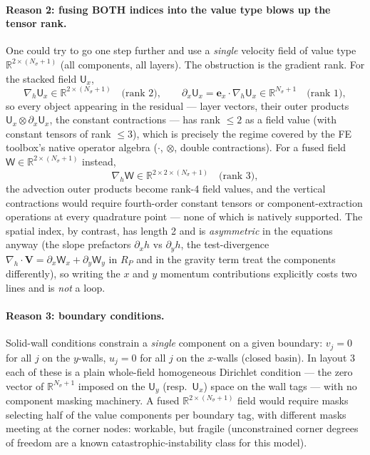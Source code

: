 \documentclass{article}
\newcommand{\Ns}{N_\sigma}
\newcommand{\nablah}{\nabla_h}
\begin{document}
\paragraph{Reason 2: fusing BOTH indices into the value type blows up the tensor rank.}
One could try to go one step further and use a \emph{single} velocity field of value type $\mathbb{R}^{2\times(\Ns+1)}$ (all components, all layers). The obstruction is the gradient rank. For the stacked field $\mathsf{U}_x$,
$$\nablah \mathsf{U}_x \in \mathbb{R}^{2\times(\Ns+1)} \quad\text{(rank 2)}, \qquad \partial_x \mathsf{U}_x = \mathbf{e}_x \cdot \nablah\mathsf{U}_x \in \mathbb{R}^{\Ns+1} \quad\text{(rank 1)},$$
so every object appearing in the residual — layer vectors, their outer products $\mathsf{U}_x \otimes \partial_x \mathsf{U}_x$, the constant contractions — has rank $\le 2$ as a field value (with constant tensors of rank $\le 3$), which is precisely the regime covered by the FE toolbox's native operator algebra ($\cdot$, $\otimes$, double contractions). For a fused field $\mathsf{W} \in \mathbb{R}^{2\times(\Ns+1)}$ instead,
$$\nablah \mathsf{W} \in \mathbb{R}^{2\times 2\times(\Ns+1)} \quad\text{(rank 3)},$$
the advection outer products become rank-4 field values, and the vertical contractions would require fourth-order constant tensors or component-extraction operations at every quadrature point — none of which is natively supported. The spatial index, by contrast, has length 2 and is \emph{asymmetric} in the equations anyway (the slope prefactors $\partial_x h$ vs $\partial_y h$, the test-divergence $\nablah\cdot\mathbf{V} = \partial_x\mathsf{W}_x + \partial_y\mathsf{W}_y$ in $R_P$ and in the gravity term treat the components differently), so writing the $x$ and $y$ momentum contributions explicitly costs two lines and is \emph{not} a loop.

\paragraph{Reason 3: boundary conditions.}
Solid-wall conditions constrain a \emph{single} component on a given boundary: $v_j = 0$ for all $j$ on the $y$-walls, $u_j = 0$ for all $j$ on the $x$-walls (closed basin). In layout 3 each of these is a plain whole-field homogeneous Dirichlet condition — the zero vector of $\mathbb{R}^{\Ns+1}$ imposed on the $\mathsf{U}_y$ (resp.\ $\mathsf{U}_x$) space on the wall tags — with no component masking machinery. A fused $\mathbb{R}^{2\times(\Ns+1)}$ field would require masks selecting half of the value components per boundary tag, with different masks meeting at the corner nodes: workable, but fragile (unconstrained corner degrees of freedom are a known catastrophic-instability class for this model).
\end{document}
